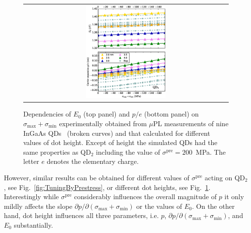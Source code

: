 \documentclass[aps,prl,amsmath,amssymb,twocolumn,showpacs,showkeys,superscriptaddress]{revtex4-1}
\begin{document}
\begin{figure}[!ht]
\renewcommand{\tabcolsep}{2pt}
\begin{center}
\begin{tabular}{c}
\includegraphics[width=0.4\textwidth]{2018-02-05__171219_8x8_neotocena_++_nn+_35deg_pres350___40x20_height.eps} \\
\end{tabular}
\end{center}
\caption{
Dependencies of $E_0$ (top panel) and $p/e$ (bottom panel) on $\sigma_{\mathrm{max}}+\sigma_{\mathrm{min}}$ experimentally obtained from $\mu$PL measurements of nine InGaAs QDs~\cite{Aberl:17} (broken curves) and that calculated for different values of dot height. Except of height the simulated QDs had the same properties as QD$_2$ including the value of $\sigma^{\mathrm{pre}}=200$~MPa. The letter $e$ denotes the elementary charge.
\label{fig:TuningByHeight}}
\end{figure}
%

However, similar results can be obtained for different values of $\sigma^{\mathrm{pre}}$ acting on QD$_2$, see Fig.~\ref{fig:TuningByPrestress}, or different dot heights, see Fig.~\ref{fig:TuningByHeight}. Interestingly while $\sigma^{\mathrm{pre}}$ considerably influences the overall magnitude of $p$ it only mildly affects the slope $\partial p/\partial(\sigma_{\mathrm{max}}+\sigma_{\mathrm{min}})$ or the values of $E_0$. On the other hand, dot height influences all three parameters, i.e. $p$, $\partial p/\partial(\sigma_{\mathrm{max}}+\sigma_{\mathrm{min}})$, and $E_0$ substantially.
\end{document}

